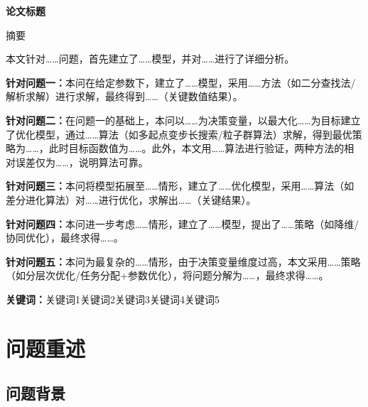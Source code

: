 \documentclass[12pt,a4paper]{ctexart}
\theoremstyle{definition}
\theoremstyle{plain}
\theoremstyle{remark}
\renewenvironment{abstract}
  {\begin{center}\heiti\zihao{-3}摘\quad 要\end{center}\zihao{-4}\songti}
  {\par\vspace{1em}}
\newcommand{\keywords}[1]{%
  \par\noindent\textbf{关键词：}#1}
\begin{document}
\pagestyle{plain}

\begin{center}
{\heiti\bfseries 论文标题}
\end{center}
\vspace{1em}

\setcounter{page}{1}

\begin{abstract}
本文针对……问题，首先建立了……模型，并对……进行了详细分析。

\textbf{针对问题一：}本问在给定参数下，建立了……模型，采用……方法（如二分查找法/解析求解）进行求解，最终得到……（关键数值结果）。

\textbf{针对问题二：}在问题一的基础上，本问以……为决策变量，以最大化……为目标建立了优化模型，通过……算法（如多起点变步长搜索/粒子群算法）求解，得到最优策略为……，此时目标函数值为……。此外，本文用……算法进行验证，两种方法的相对误差仅为……，说明算法可靠。

\textbf{针对问题三：}本问将模型拓展至……情形，建立了……优化模型，采用……算法（如差分进化算法）对……进行优化，求解出……（关键结果）。

\textbf{针对问题四：}本问进一步考虑……情形，建立了……模型，提出了……策略（如降维/协同优化），最终求得……。

\textbf{针对问题五：}本问为最复杂的……情形，由于决策变量维度过高，本文采用……策略（如分层次优化/任务分配+参数优化），将问题分解为……，最终求得……。
\end{abstract}

\keywords{关键词1\quad 关键词2\quad 关键词3\quad 关键词4\quad 关键词5}



\section{问题重述}

\subsection{问题背景}

%
\end{document}
